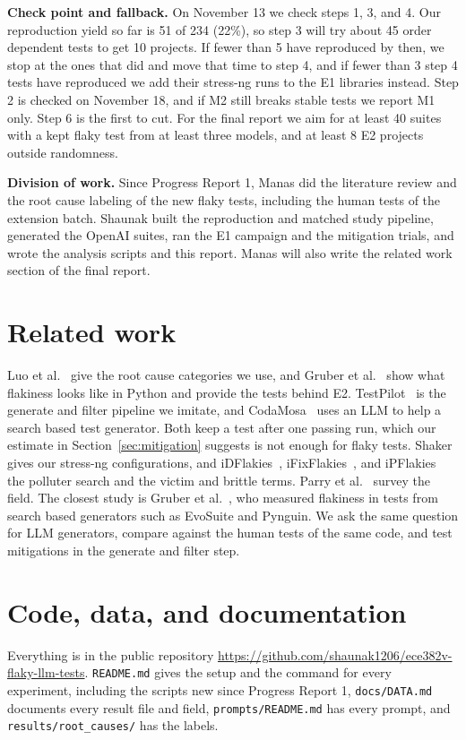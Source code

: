 \documentclass[sigconf,nonacm]{acmart}
\begin{document}
\textbf{Check point and fallback.} On November 13 we check steps 1, 3, and 4. Our reproduction yield so far is 51 of 234 (22\%), so step 3 will try about 45 order dependent tests to get 10 projects. If fewer than 5 have reproduced by then, we stop at the ones that did and move that time to step 4, and if fewer than 3 step 4 tests have reproduced we add their stress-ng runs to the E1 libraries instead. Step 2 is checked on November 18, and if M2 still breaks stable tests we report M1 only. Step 6 is the first to cut. For the final report we aim for at least 40 suites with a kept flaky test from at least three models, and at least 8 E2 projects outside randomness.

\textbf{Division of work.} Since Progress Report 1, Manas did the literature review and the root cause labeling of the new flaky tests, including the human tests of the extension batch. Shaunak built the reproduction and matched study pipeline, generated the OpenAI suites, ran the E1 campaign and the mitigation trials, and wrote the analysis scripts and this report. Manas will also write the related work section of the final report.

\section{Related work}
Luo et al.~\cite{luo2014} give the root cause categories we use, and Gruber et al.~\cite{gruber2021} show what flakiness looks like in Python and provide the tests behind E2. TestPilot~\cite{schafer2024} is the generate and filter pipeline we imitate, and CodaMosa~\cite{lemieux2023} uses an LLM to help a search based test generator. Both keep a test after one passing run, which our estimate in Section~\ref{sec:mitigation} suggests is not enough for flaky tests. Shaker~\cite{silva2020} gives our stress-ng configurations, and iDFlakies~\cite{lam2019}, iFixFlakies~\cite{shi2019}, and iPFlakies~\cite{wang2022} the polluter search and the victim and brittle terms. Parry et al.~\cite{parry2021} survey the field. The closest study is Gruber et al.~\cite{gruber2024}, who measured flakiness in tests from search based generators such as EvoSuite and Pynguin. We ask the same question for LLM generators, compare against the human tests of the same code, and test mitigations in the generate and filter step.

\section{Code, data, and documentation}
Everything is in the public repository \url{https://github.com/shaunak1206/ece382v-flaky-llm-tests}. \texttt{README.md} gives the setup and the command for every experiment, including the scripts new since Progress Report 1, \texttt{docs/DATA.md} documents every result file and field, \texttt{prompts/README.md} has every prompt, and \texttt{results/root\_causes/} has the labels.



\end{document}
